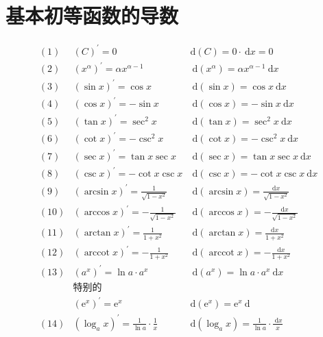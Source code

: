 \section{基本初等函数的导数}
\begin{theorem}
	$$
	\begin{aligned}
		(1)& (C)^{\prime}=0 & \mathrm{d}(C)=0 \cdot \mathrm{~d} x=0 \\
		(2)& \left(x^\alpha\right)^{\prime}=\alpha x^{\alpha-1}& \mathrm{~d}\left(x^\alpha\right)=\alpha x^{\alpha-1} \mathrm{~d} x \\
		(3)& (\sin x)^{\prime}=\cos x & \mathrm{~d}(\sin x)=\cos x \mathrm{~d} x\\
		(4)& (\cos x)^{\prime}=-\sin x 	& \mathrm{~d}(\cos x)=-\sin x \mathrm{~d} x\\
		(5)& (\tan x)^{\prime}=\sec ^2 x & \mathrm{~d}(\tan x)=\sec ^2 x \mathrm{~d} x\\
		(6)& (\cot x)^{\prime}=-\csc ^2 x & \mathrm{~d}(\cot x)=-\csc ^2 x \mathrm{~d} x\\
		(7)& (\sec x)^{\prime}=\tan x \sec x & \mathrm{~d}(\sec x)=\tan x \sec x \mathrm{~d} x\\
		(8)& (\csc x)^{\prime}=-\cot x \csc x & \mathrm{~d}(\csc x)=-\cot x \csc x \mathrm{~d} x \\
		(9)& (\arcsin x)^{\prime}=\frac{1}{\sqrt{1-x^2}}	& \mathrm{~d}(\arcsin x)=\frac{\mathrm{d} x}{\sqrt{1-x^2}}  \\
		(10)& (\arccos x)^{\prime}=-\frac{1}{\sqrt{1-x^2}} & \mathrm{~d}(\arccos x)=-\frac{\mathrm{d} x}{\sqrt{1-x^2}} \\
		(11)& (\arctan x)^{\prime}=\frac{1}{1+x^2}& \mathrm{~d}(\arctan x)=\frac{\mathrm{d} x}{1+x^2} \\
		(12)& (\operatorname{arccot} x)^{\prime}=-\frac{1}{1+x^2}& \mathrm{~d}(\operatorname{arccot} x)=-\frac{\mathrm{d} x}{1+x^2}  \\
		(13)& \left(a^x\right)^{\prime}=\ln a \cdot a^x& \mathrm{~d}\left(a^x\right)=\ln a \cdot a^x \mathrm{~d} x\\
		&\text{特别的}&\\
		&\left(\mathrm{e}^x\right)^{\prime}=\mathrm{e}^x&\mathrm{d}\left(\mathrm{e}^x\right)=\mathrm{e}^x \mathrm{~d}\\
		(14)&\left(\log _a x\right)^{\prime}=\frac{1}{\ln a} \cdot \frac{1}{x}&\mathrm{d}\left(\log _a x\right)=\frac{1}{\ln a} \cdot \frac{\mathrm{~d} x}{x}\\

\end{aligned}$$
\end{theorem}
